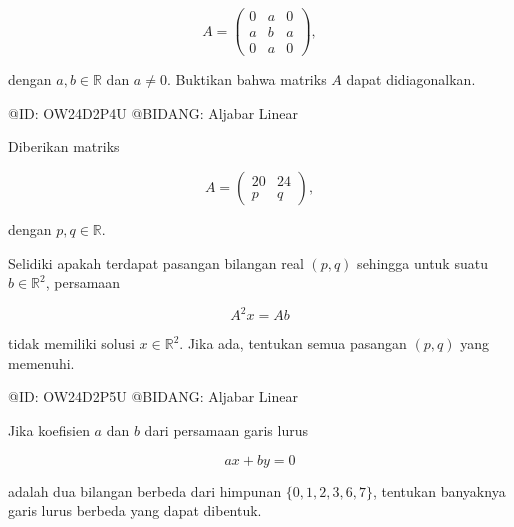$$
A=
\begin{pmatrix}
0&a&0\\
a&b&a\\
0&a&0
\end{pmatrix},
$$

dengan $a,b\in\mathbb R$ dan $a\ne0$. Buktikan bahwa matriks $A$ dapat didiagonalkan.


@ID: OW24D2P4U
@BIDANG: Aljabar Linear

Diberikan matriks

$$
A=
\begin{pmatrix}
20&24\\
p&q
\end{pmatrix},
$$

dengan $p,q\in\mathbb R$.

Selidiki apakah terdapat pasangan bilangan real $(p,q)$ sehingga untuk suatu $b\in\mathbb R^2$, persamaan

$$
A^2x=Ab
$$

tidak memiliki solusi $x\in\mathbb R^2$. Jika ada, tentukan semua pasangan $(p,q)$ yang memenuhi.

@ID: OW24D2P5U
@BIDANG: Aljabar Linear

Jika koefisien $a$ dan $b$ dari persamaan garis lurus

$$
ax+by=0
$$

adalah dua bilangan berbeda dari himpunan $\{0,1,2,3,6,7\}$, tentukan banyaknya garis lurus berbeda yang dapat dibentuk.